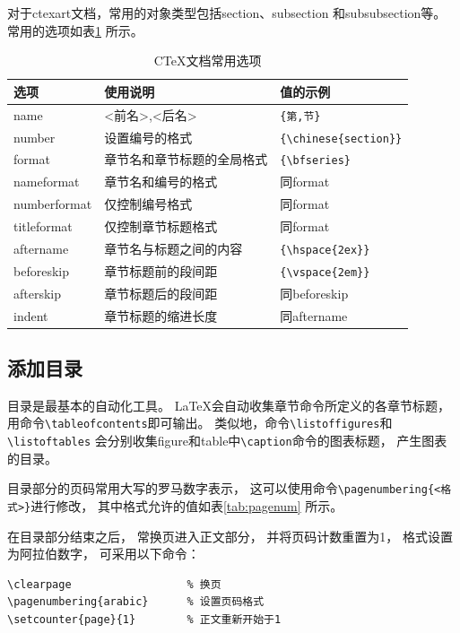 \documentclass{ctexart}
\numberwithin{equation}{section}			%
\begin{document}
	对于ctexart文档，常用的对象类型包括section、subsection
	和subsubsection等。
	常用的选项如表\ref{tab:ctexopt} 所示。
	
	\begin{table}
		\centering
		\caption{C\TeX 文档常用选项}
		\label{tab:ctexopt}
		\begin{tabular}{lll}
			\toprule
			选项 & 使用说明 & 值的示例 \\
			\midrule
			name & {<前名>,<后名>} & \verb|{第,节}| \\
			number & 设置编号的格式 & \verb|{\chinese{section}}| \\
			format & 章节名和章节标题的全局格式 & \verb|{\bfseries}| \\
			nameformat & 章节名和编号的格式 & 同format \\
			numberformat & 仅控制编号格式 & 同format \\
			titleformat & 仅控制章节标题格式 & 同format\\
			aftername & 章节名与标题之间的内容 & \verb|{\hspace{2ex}}| \\
			beforeskip & 章节标题前的段间距 & \verb|{\vspace{2em}}| \\
			afterskip & 章节标题后的段间距 & 同beforeskip \\
			indent & 章节标题的缩进长度 & 同aftername \\
			\bottomrule
		\end{tabular}
	\end{table}
	
	\subsection{添加目录}
	目录是最基本的自动化工具。
	\LaTeX 会自动收集章节命令所定义的各章节标题，
	用命令\verb|\tableofcontents|即可输出。
	类似地，命令\verb|\listoffigures|和\verb|\listoftables|
	会分别收集figure和table中\verb|\caption|命令的图表标题，
	产生图表的目录。
	
	目录部分的页码常用大写的罗马数字表示，
	这可以使用命令\verb|\pagenumbering{<格式>}|进行修改，
	其中格式允许的值如表\ref{tab:pagenum} 所示。
	
	在目录部分结束之后，
	常换页进入正文部分，
	并将页码计数重置为1，
	格式设置为阿拉伯数字，
	可采用以下命令：
	
\begin{lstlisting}
\clearpage					% 换页
\pagenumbering{arabic}		% 设置页码格式
\setcounter{page}{1}		% 正文重新开始于1
\end{lstlisting}
	
\end{document}
